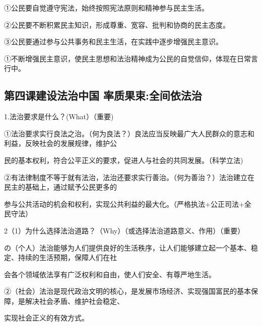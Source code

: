 \documentclass[lang=cn,11pt]{elegantbook}
\newcommand{\daofasym}[1]{{\daofasymbolfont #1}}
\newcommand{\daofasym}[1]{#1}
\begin{document}
\daofasym{①}公民要自觉遵守宪法，始终按照宪法原则和精神参与民主生活。\par

\daofasym{②}公民要不断积累民主知识，形成尊重、宽容、批判和协商的民主态度。\par

\daofasym{③}公民要通过参与公共事务和民主生活，在实践中逐步增强民主意识。\par

\daofasym{①}不断增强民主意识，使民主思想和法治精神成为公民的自觉信仰，体现在日常言行中。\par

\subsection*{第四课建设法治中国 率质果束:全间依法治}

1.法治要求是什么？(What）（重要)\par

\daofasym{①}法治要求实行良法之治。（何为良法？）良法应当反映最广大人民群众的意志和利益，反映社会的发展规律，维护公\par

民的基本权利，符合公平正义的要求，促进人与社会的共同发展。（科学立法)\par

\daofasym{②}有法律制度不等于就有法治，法治还要求实行善治。（何为善治？）法治建立在民主的基础上，通过赋予公民更多的\par

参与公共活动的机会和权利，实现公共利益的最大化。（严格执法+公正司法+全民守法）\par

2（1）为什么选择法治道路？（Why）（或选择法治道路意义、作用）（重要）\par

の（个人）法治能够为人们提供良好的生活秩序，让人们能够建立起一个基本、稳定、持续的生活预期，保障人们在社\par

会各个领域依法享有广泛权利和自由，使人们安全、有尊严地生活。\par

\daofasym{②}（社会）法治是现代政治文明的核心，是发展市场经济、实现强国富民的基本保障，是解决社会矛盾、维护社会稳定、\par

实现社会正义的有效方式。\par
\end{document}
